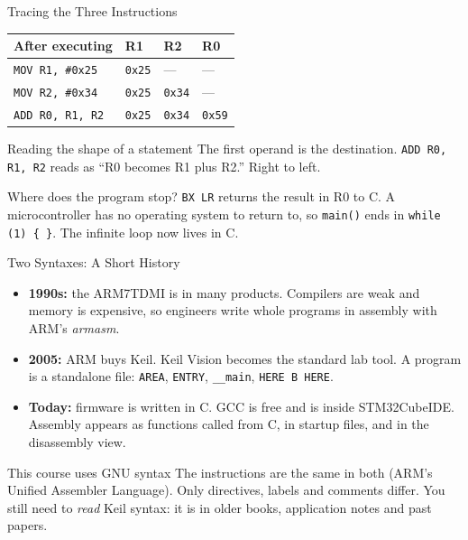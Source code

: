 \documentclass[9pt,aspectratio=169,xcolor=table]{beamer}
\begin{document}
\begin{frame}{Tracing the Three Instructions}
    \begin{center}
    {\small
    \striped
    \begin{tabular}{@{}l l l l@{}}
        \toprule
        \textbf{After executing} & \textbf{R1} & \textbf{R2} & \textbf{R0} \\
        \midrule
        \texttt{MOV R1, \#0x25}       & \texttt{0x25} & ---           & ---           \\
        \texttt{MOV R2, \#0x34}       & \texttt{0x25} & \texttt{0x34} & ---           \\
        \texttt{ADD R0, R1, R2}       & \texttt{0x25} & \texttt{0x34} & \texttt{0x59} \\
        \bottomrule
    \end{tabular}}
    \end{center}

    \vspace{3mm}
    \begin{block}{Reading the shape of a statement}
        The first operand is the \alert{destination}. \texttt{ADD R0, R1, R2}
        reads as ``R0 becomes R1 plus R2.'' Right to left.
    \end{block}

    \begin{block}{Where does the program stop?}
        \texttt{BX LR} returns the result in R0 to C. A microcontroller has no
        operating system to return to, so \texttt{main()} ends in \texttt{while (1) \{ \}}.
        The infinite loop now lives in C.
    \end{block}
\end{frame}

\begin{frame}{Two Syntaxes: A Short History}
    \begin{itemize}\itemsep3pt
        \item \textbf{1990s:} the ARM7TDMI is in many products. Compilers are weak and memory is
              expensive, so engineers write \alert{whole programs} in assembly with ARM's
              \emph{armasm}.
        \item \textbf{2005:} ARM buys Keil. Keil \textmu Vision becomes the standard lab tool. A
              program is a standalone file: \texttt{AREA}, \texttt{ENTRY}, \texttt{\_\_main},
              \texttt{HERE B HERE}.
        \item \textbf{Today:} firmware is written in C. GCC is free and is inside STM32CubeIDE.
              Assembly appears as \alert{functions called from C}, in startup files, and in the
              disassembly view.
    \end{itemize}

    \vspace{2mm}
    \begin{block}{This course uses GNU syntax}
        The \alert{instructions} are the same in both (ARM's Unified Assembler Language).
        Only directives, labels and comments differ. You still need to \emph{read} Keil
        syntax: it is in older books, application notes and past papers.
    \end{block}
\end{frame}
\end{document}
